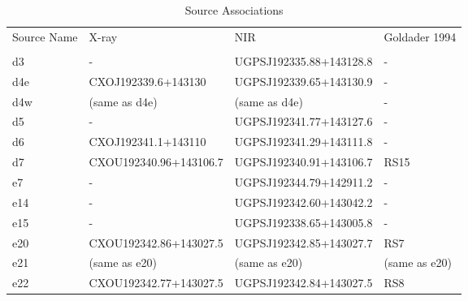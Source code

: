 \begin{table*}[htp]
\caption{Source Associations}
\begin{tabular}{llll}
\label{tab:associations}
Source Name & X-ray & NIR & Goldader 1994 \\
 &  &  &  \\
\hline
d3 & - & UGPSJ192335.88+143128.8 & - \\
d4e & CXOJ192339.6+143130 & UGPSJ192339.65+143130.9 & - \\
d4w & (same as d4e) & (same as d4e) & - \\
d5 & - & UGPSJ192341.77+143127.6 & - \\
d6 & CXOJ192341.1+143110 & UGPSJ192341.29+143111.8 & - \\
d7 & CXOU192340.96+143106.7 & UGPSJ192340.91+143106.7 & RS15 \\
e7 & - & UGPSJ192344.79+142911.2 & - \\
e14 & - & UGPSJ192342.60+143042.2 & - \\
e15 & - & UGPSJ192338.65+143005.8 & - \\
e20 & CXOU192342.86+143027.5 & UGPSJ192342.85+143027.7 & RS7 \\
e21 & (same as e20) & (same as e20) & (same as e20) \\
e22 & CXOU192342.77+143027.5 & UGPSJ192342.84+143027.5 & RS8 \\
\hline
\end{tabular}

\end{table*}
